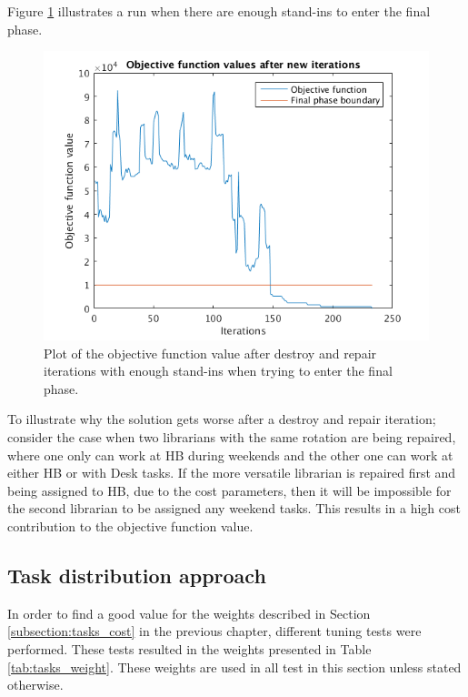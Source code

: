 Figure \ref{fig:feasibleNoRerun} illustrates a run when there are enough stand-ins to enter the final phase.

\begin{figure}[!h]
	\centering
	\includegraphics[scale = 0.8]{Chapters/ImagesClaes/1phase1iterNoReRun.png}
	\caption{Plot of the objective function value after destroy and repair iterations with enough stand-ins when trying to enter the final phase.}
	\label{fig:feasibleNoRerun}
\end{figure}

To illustrate why the solution gets worse after a destroy and repair iteration; consider the case when two librarians with the same rotation are being repaired, where one only can work at HB during weekends and the other one can work at either HB or with Desk tasks. If the more versatile librarian is repaired first and being assigned to HB, due to the cost parameters, then it will be impossible for the second librarian to be assigned any weekend tasks. This results in a high cost contribution to the objective function value.

\subsection{Task distribution approach}\label{sec:task_dist_res}

In order to find a good value for the weights described in Section \ref{subsection:tasks_cost} in the previous chapter, different tuning tests were performed. These tests resulted in the weights presented in Table \ref{tab:tasks_weight}. These weights are used in all test in this section unless stated otherwise.

